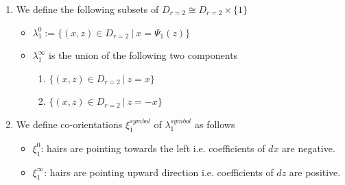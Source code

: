 \begin{definition}
\begin{enumerate}
\item We define the following subsets of $D_{r=2} \cong D_{r=2}\times \{1\}$
\begin{itemize}
\item $\lambda_1^0 := \{(x,z) \in D_{r=2} ~|~ x = \Psi_1(z)\}$

\item $\lambda_1^\infty$ is the union of the following two components
\begin{enumerate}[label=(\roman*)]
\item $\{(x,z) \in D_{r=2} ~|~ z = x \}$

\item $\{(x,z) \in D_{r=2} ~|~ z = -x \}$
\end{enumerate}
\end{itemize}

\item We define co-orientations $\xi_1^{symbol}$ of $\lambda_1^{symbol}$ as follows
\begin{itemize}
\item $\xi_1^0$: hairs are pointing towards the left i.e. coefficients of $dx$ are negative.

\item $\xi_1^\infty$: hairs are pointing upward direction i.e. coefficients of $dz$ are positive.
\end{itemize}
\end{enumerate}
\end{definition}

